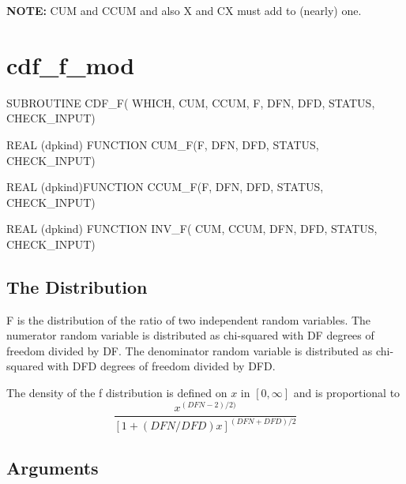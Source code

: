 \documentclass[12pt,dvips]{article}
\newcommand{\mysection}[1]{\color{blue}
             \section{#1} \normalcolor}
\newcommand{\mysubsection}[1] {\color{green}
             \subsection{#1} \normalcolor}
\begin{document}
{\bf NOTE:} CUM and CCUM and also X and CX must add to (nearly) one.

\pagebreak

\mysection{cdf\_f\_mod}

\begin{description}

\item SUBROUTINE CDF\_F( WHICH, CUM, CCUM, F, DFN, DFD,
STATUS, CHECK\_INPUT)

\item    REAL   (dpkind)   FUNCTION    CUM\_F(F,
DFN, DFD, STATUS, CHECK\_INPUT)

\item    REAL    (dpkind)FUNCTION    CCUM\_F(F,
DFN, DFD, STATUS, CHECK\_INPUT)

\item  REAL (dpkind) FUNCTION  INV\_F(  CUM, CCUM,
DFN, DFD, STATUS, CHECK\_INPUT)

\end{description}

\mysubsection{The Distribution}

F  is  the  distribution  of  the  ratio  of  two  independent  random
variables.    The  numerator   random  variable   is   distributed  as
chi-squared  with  DF  degrees   of  freedom  divided  by  DF.   The
denominator  random variable  is distributed  as chi-squared  with DFD
degrees of freedom divided by DFD.

The density of the f distribution is defined on $x$ in $[0,\infty]$ and
is proportional to
\[ \frac{x^{(DFN-2)/2)}}{\left[1+(DFN/DFD)x\right]^{(DFN+DFD)/2}} \]

\mysubsection{Arguments}
\end{document}
